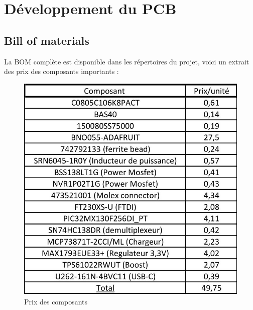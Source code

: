 \section{Développement du PCB}

\subsection{Bill of materials} \label{ssec:BOM}
{
	La BOM complète est disponible dans les répertoires du projet, voici un extrait des prix des composants importants :
	
	\begin{figure}[h]
		\centering
		\includegraphics[width=0.7\linewidth]{Figures/Prix_Composants}
		\caption{Prix des composants}
		\label{fig:prixcomposants}
	\end{figure}
	
}
\clearpage

